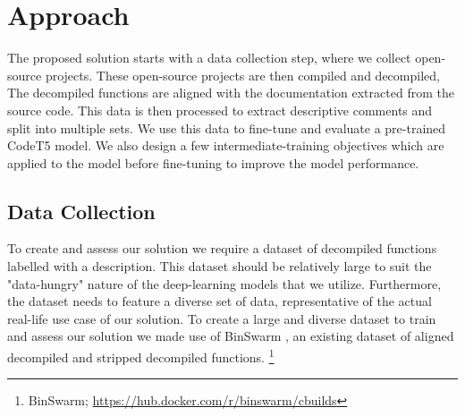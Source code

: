 \chapter{Approach}
\label{methodology}

The proposed solution starts with a data collection step, where we collect open-source projects. These open-source projects are then compiled and decompiled, The decompiled functions are aligned with the documentation extracted from the source code. This data is then processed to extract descriptive comments and split into multiple sets. We use this data to fine-tune and evaluate a pre-trained CodeT5 model. We also design a few intermediate-training objectives which are applied to the model before fine-tuning to improve the model performance. 


\section{Data Collection}
To create and assess our solution we require a dataset of decompiled functions labelled with a description. This dataset should be relatively large to suit the "data-hungry" nature of the deep-learning models that we utilize. Furthermore, the dataset needs to feature a diverse set of data, representative of the actual real-life use case of our solution. 
To create a large and diverse dataset to train and assess our solution we made use of BinSwarm \cite{InlinedFunc}, an existing dataset of aligned decompiled and stripped decompiled functions. \footnote{BinSwarm; \url{https://hub.docker.com/r/binswarm/cbuilds}}

